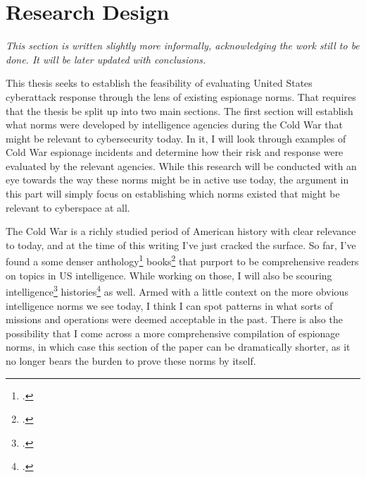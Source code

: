 \documentclass[12pt]{article}
\begin{document}
\section{Research Design}
\emph{This section is written slightly more informally, acknowledging the work still to be done. It will be later updated with conclusions.}

This thesis seeks to establish the feasibility of evaluating United States cyberattack response through the lens of existing espionage norms. That requires that the thesis be split up into two main sections. The first section will establish what norms were developed by intelligence agencies during the Cold War that might be relevant to cybersecurity today. In it, I will look through examples of Cold War espionage incidents and determine how their risk and response were evaluated by the relevant agencies. While this research will be conducted with an eye towards the way these norms might be in active use today, the argument in this part will simply focus on establishing which norms existed that might be relevant to cyberspace at all. 

The Cold War is a richly studied period of American history with clear relevance to today, and at the time of this writing I've just cracked the surface. So far, I've found a some denser anthology\footcite{andrew_secret_2009} books\footcite{johnson_intelligence_2015} that purport to be comprehensive readers on topics in US intelligence. While working on those, I will also be scouring intelligence\footcite{prados_william_2009} histories\footcite{prados_presidents_1996} as well. Armed with a little context on the more obvious intelligence norms we see today, I think I can spot patterns in what sorts of missions and operations were deemed acceptable in the past. There is also the possibility that I come across a more comprehensive compilation of espionage norms, in which case this section of the paper can be dramatically shorter, as it no longer bears the burden to prove these norms by itself.
\end{document}
